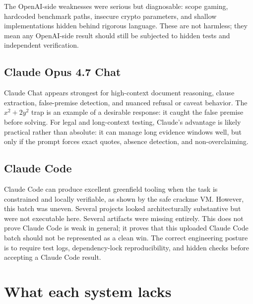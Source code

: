 \documentclass[11pt]{article}
\begin{document}
The OpenAI-side weaknesses were serious but diagnosable: scope gaming, hardcoded benchmark paths, insecure crypto parameters, and shallow implementations hidden behind rigorous language. These are not harmless; they mean any OpenAI-side result should still be subjected to hidden tests and independent verification.

\subsection{Claude Opus 4.7 Chat}

Claude Chat appears strongest for high-context document reasoning, clause extraction, false-premise detection, and nuanced refusal or caveat behavior. The $x^2+2y^2$ trap is an example of a desirable response: it caught the false premise before solving. For legal and long-context testing, Claude's advantage is likely practical rather than absolute: it can manage long evidence windows well, but only if the prompt forces exact quotes, absence detection, and non-overclaiming.

\subsection{Claude Code}

Claude Code can produce excellent greenfield tooling when the task is constrained and locally verifiable, as shown by the safe crackme VM. However, this batch was uneven. Several projects looked architecturally substantive but were not executable here. Several artifacts were missing entirely. This does not prove Claude Code is weak in general; it proves that this uploaded Claude Code batch should not be represented as a clean win. The correct engineering posture is to require test logs, dependency-lock reproducibility, and hidden checks before accepting a Claude Code result.

\section{What each system lacks}
\end{document}
